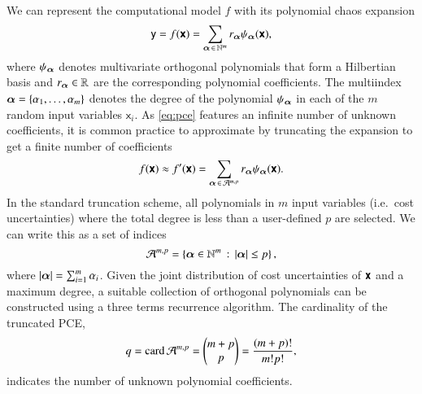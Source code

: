 We can represent the computational model $f$ with its polynomial chaos expansion
\begin{equation}
    \mathsf{y} = f(\boldsymbol{\mathsf{x}}) = \sum_{{\bm{\alpha}} \,\in\, \mathbb{N}^m} r_{{\bm{\alpha}}} \psi_{{\bm{\alpha}}}(\boldsymbol{\mathsf{x}}),
    \label{eq:pce}
\end{equation}
where $\psi_{\bm{\alpha}}$ denotes multivariate orthogonal polynomials that form
a Hilbertian basis and $r_{\bm{\alpha}} \in \mathbb{R}$ are the corresponding polynomial coefficients.\cite{sudret_global_2008} The multiindex ${\bm{\alpha}} = \{\alpha_1,\dots,\alpha_m\}$
denotes the degree of the polynomial $\psi_{\bm{\alpha}}$ in each of the $m$ random input variables $\mathsf{x}_i$.
As \cref{eq:pce} features an infinite number of unknown coefficients,
it is common practice to approximate by truncating the expansion to get a finite number of coefficients
\begin{equation}
    f(\boldsymbol{\mathsf{x}}) \approx f'(\boldsymbol{\mathsf{x}}) = \sum_{{\bm{\alpha}} \,\in\, \mathcal{A}^{m,p}} r_{\bm{\alpha}} \psi_{\bm{\alpha}}(\boldsymbol{\mathsf{x}}).
\end{equation}
In the standard truncation
scheme,\cite{gratiet_metamodel-based_2015,sudret_global_2008} all polynomials in
$m$ input variables (i.e.~cost uncertainties) where the total degree is less
than a user-defined $p$ are selected. We can write this as a set of indices
\begin{equation}
    \label{eq:ca}
    \mathcal{A}^{m,p} = \left\{{\bm{\alpha}} \in \mathbb{N}^m \,:\, \left|{\bm{\alpha}}\right| \leq p\right\},
\end{equation}
where $\left|{\bm{\alpha}}\right| = \sum_{i=1}^m \alpha_i$.
Given the joint distribution of cost uncertainties of $\boldsymbol{\mathsf{x}}$ and a maximum degree,
a suitable collection of orthogonal polynomials can be constructed
using a three terms recurrence algorithm.\cite{feinberg_chaospy_2015}
The cardinality of the truncated PCE,
\begin{equation}
    q = \text{card}\, \mathcal{A}^{m,p} = \left(\begin{matrix}
        m+p \\
        p
    \end{matrix}\right) = \frac{(m+p)!}{m!p!},
    \label{eq:cardinality}
\end{equation}
indicates the number of unknown polynomial coefficients.

